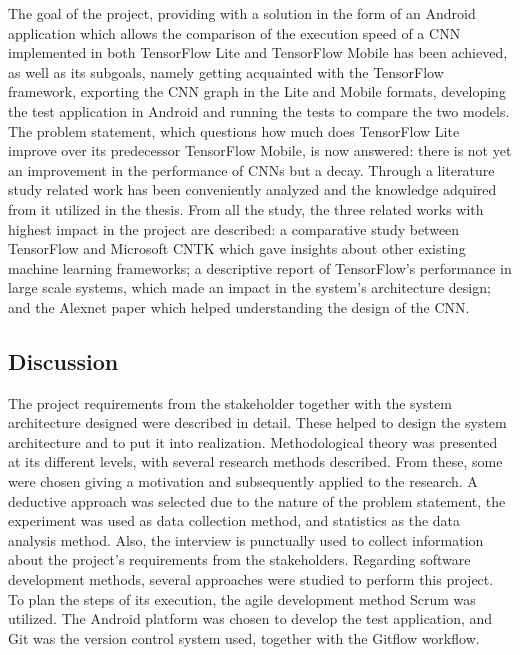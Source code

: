 The goal of the project, providing with a solution in the form of an Android application which allows the comparison of the execution speed of a CNN implemented in both TensorFlow Lite and TensorFlow Mobile has been achieved, as well as its subgoals, namely getting acquainted with the TensorFlow framework, exporting the CNN graph in the Lite and Mobile formats, developing the test application in Android and running the tests to compare the two models. The problem statement, which questions how much does TensorFlow Lite improve over its predecessor TensorFlow Mobile, is now answered: there is not yet an improvement in the performance of CNNs but a decay. Through a literature study related work has been conveniently analyzed and the knowledge adquired from it utilized in the thesis. From all the study, the three related works with highest impact in the project are described: a comparative study between TensorFlow and Microsoft CNTK which gave insights about other existing machine learning frameworks; a descriptive report of TensorFlow's performance in large scale systems, which made an impact in the system's architecture design; and the Alexnet paper which helped understanding the design of the CNN. \\

\subsection{Discussion}
The project requirements from the stakeholder together with the system architecture designed were described in detail. These helped to design the system architecture and to put it into realization. Methodological theory was presented at its different levels, with several research methods described. From these, some were chosen giving a motivation and subsequently applied to the research. A deductive approach was selected due to the nature of the problem statement, the experiment was used as data collection method, and statistics as the data analysis method. Also, the interview is punctually used to collect information about the project's requirements from the stakeholders. Regarding software development methods, several approaches were studied to perform this project. To plan the steps of its execution, the agile development method Scrum was utilized. The Android platform was chosen to develop the test application, and Git was the version control system used, together with the Gitflow workflow. \\

